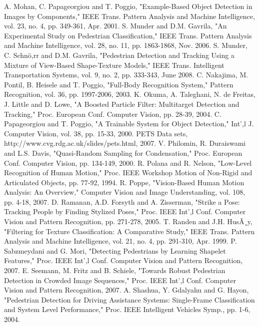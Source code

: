 \documentclass[10pt,letterpaper,journal,compsoc]{IEEEtran}
\begin{document}
\begin{thebibliography}{99}
A. Mohan, C. Papageorgiou and T. Poggio, "Example-Based Object Detection in Images by Components," IEEE Trans. Pattern Analysis and Machine Intelligence, vol. 23, no. 4, pp. 349-361, Apr. 2001. 
S. Munder and D.M. Gavrila, "An Experimental Study on Pedestrian Classification," IEEE Trans. Pattern Analysis and Machine Intelligence, vol. 28, no. 11, pp. 1863-1868, Nov. 2006. 
S. Munder, C. Schnö,rr and D.M. Gavrila, "Pedestrian Detection and Tracking Using a Mixture of View-Based Shape-Texture Models," IEEE Trans. Intelligent Transportation Systems, vol. 9, no. 2, pp. 333-343, June 2008. 
C. Nakajima, M. Pontil, B. Heisele and T. Poggio, "Full-Body Recognition System," Pattern Recognition, vol. 36, pp. 1997-2006, 2003. 
K. Okuma, A. Taleghani, N. de Freitas, J. Little and D. Lowe, "A Boosted Particle Filter: Multitarget Detection and Tracking," Proc. European Conf. Computer Vision, pp. 28-39, 2004.
C. Papageorgiou and T. Poggio, "A Trainable System for Object Detection," Int',l J. Computer Vision, vol. 38, pp. 15-33, 2000.
PETS Data sets, http://www.cvg.rdg.ac.uk/slides/pets.html, 2007. 
V. Philomin, R. Duraiswami and L.S. Davis, "Quasi-Random Sampling for Condensation," Proc. European Conf. Computer Vision, pp. 134-149, 2000. 
R. Polana and R. Nelson, "Low-Level Recognition of Human Motion," Proc. IEEE Workshop Motion of Non-Rigid and Articulated Objects, pp. 77-92, 1994. 
R. Poppe, "Vision-Based Human Motion Analysis: An Overview," Computer Vision and Image Understanding, vol. 108, pp. 4-18, 2007. 
D. Ramanan, A.D. Forsyth and A. Zisserman, "Strike a Pose: Tracking People by Finding Stylized Poses," Proc. IEEE Int',l Conf. Computer Vision and Pattern Recognition, pp. 271-278, 2005. 
T. Randen and J.H. HusÃ¸y, "Filtering for Texture Classification: A Comparative Study," IEEE Trans. Pattern Analysis and Machine Intelligence, vol. 21, no. 4, pp. 291-310, Apr. 1999. 
P. Sabzmeydani and G. Mori, "Detecting Pedestrians by Learning Shapelet Features," Proc. IEEE Int',l Conf. Computer Vision and Pattern Recognition, 2007. 
E. Seemann, M. Fritz and B. Schiele, "Towards Robust Pedestrian Detection in Crowded Image Sequences," Proc. IEEE Int',l Conf. Computer Vision and Pattern Recognition, 2007. 
A. Shashua, Y. Gdalyahu and G. Hayon, "Pedestrian Detection for Driving Assistance Systems: Single-Frame Classification and System Level Performance," Proc. IEEE Intelligent Vehicles Symp., pp. 1-6, 2004. 

\end{thebibliography}
\end{document}
